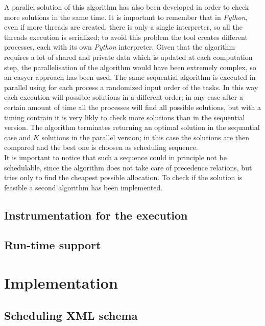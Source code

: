 \documentclass[a4paper,11pt,oneside]{book}
\begin{document}
A parallel solution of this algorithm has also been developed in order to check more solutions in the same time. It is important to remember that in \emph{Python}, even if more threads are created, there is only a single interpreter, so all the threads execution is serialized; to avoid this problem the tool creates different processes, each with its own \emph{Python} interpreter. Given that the algorithm requires a lot of shared and private data which is updated at each computation step, the parallelisation of the algorithm would have been extremely complex, so an easyer approach has been used. The same sequential algorithm is executed in parallel using for each process a randomized input order of the tasks. In this way each execution will possible solutions in a different order; in any case after a certain amount of time all the processes will find all possible solutions, but with a timing contrain it is very likly to check more solutions than in the sequential version. The algorithm terminates returning an optimal solution in the sequantial case and $K$ solutions in the parallel version; in this case the solutions are then compared and the best one is choosen as scheduling sequence. \\
It is important to notice that such a sequence could in principle not be schedulable, since the algorithm does not take care of precedence relations, but tries only to find the cheapest possible allocation. To check if the solution is feasible a second algorithm has been implemented.\\













\section{Instrumentation for the execution}
\section{Run-time support}

\chapter{Implementation}
\section{Scheduling XML schema}
\end{document}

